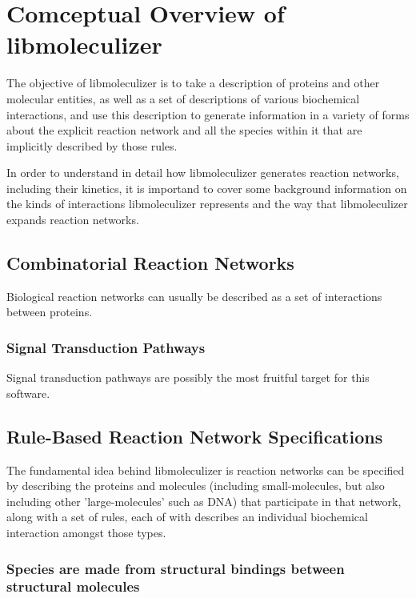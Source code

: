 \chapter{Comceptual Overview of libmoleculizer}

The objective of libmoleculizer is to take a description of proteins
and other molecular entities, as well as a set of descriptions of
various biochemical interactions, and use this description to generate
information in a variety of forms about the explicit reaction network
and all the species within it that are implicitly described by those
rules.  

In order to understand in detail how libmoleculizer generates reaction
networks, including their kinetics, it is importand to cover some
background information on the kinds of interactions libmoleculizer
represents and the way that libmoleculizer expands reaction networks.  

\section{Combinatorial Reaction Networks}
Biological reaction networks can usually be described as a set of
interactions between proteins.  

\subsection{Signal Transduction Pathways}
Signal transduction pathways are possibly the most fruitful target for
this software.  


\section{Rule-Based Reaction  Network Specifications}

The fundamental idea behind libmoleculizer is reaction networks can
be specified by describing the proteins and molecules (including
small-molecules, but also including other 'large-molecules' such as
DNA) that participate in that network, along with a set of rules, each
of with describes an individual biochemical interaction amongst those
types.  


\subsection{Species are made from structural bindings between
  structural molecules}

